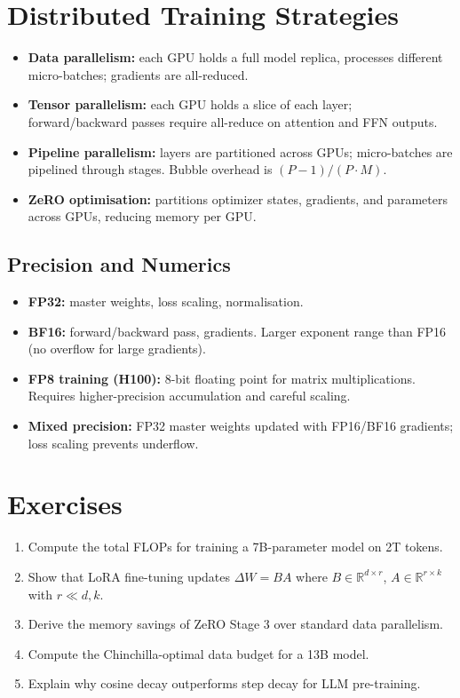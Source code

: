 \documentclass[11pt,a4paper]{book}
\theoremstyle{definition}
\begin{document}
\section{Distributed Training Strategies}

\begin{itemize}
	\item \textbf{Data parallelism:} each GPU holds a full model replica, processes different micro-batches; gradients are all-reduced.
	\item \textbf{Tensor parallelism:} each GPU holds a slice of each layer; forward/backward passes require all-reduce on attention and FFN outputs.
	\item \textbf{Pipeline parallelism:} layers are partitioned across GPUs; micro-batches are pipelined through stages. Bubble overhead is $(P-1)/(P \cdot M)$.
	\item \textbf{ZeRO optimisation:} partitions optimizer states, gradients, and parameters across GPUs, reducing memory per GPU.
\end{itemize}

\subsection{Precision and Numerics}

\begin{itemize}
	\item \textbf{FP32:} master weights, loss scaling, normalisation.
	\item \textbf{BF16:} forward/backward pass, gradients. Larger exponent range than FP16 (no overflow for large gradients).
	\item \textbf{FP8 training (H100):} 8-bit floating point for matrix multiplications. Requires higher-precision accumulation and careful scaling.
	\item \textbf{Mixed precision:} FP32 master weights updated with FP16/BF16 gradients; loss scaling prevents underflow.
\end{itemize}

\section{Exercises}

\begin{enumerate}
	\item Compute the total FLOPs for training a 7B-parameter model on 2T tokens.
	\item Show that LoRA fine-tuning updates $\Delta W = BA$ where $B \in \mathbb{R}^{d \times r}$, $A \in \mathbb{R}^{r \times k}$ with $r \ll d,k$.
	\item Derive the memory savings of ZeRO Stage 3 over standard data parallelism.
	\item Compute the Chinchilla-optimal data budget for a 13B model.
	\item Explain why cosine decay outperforms step decay for LLM pre-training.
\end{enumerate}
\end{document}
